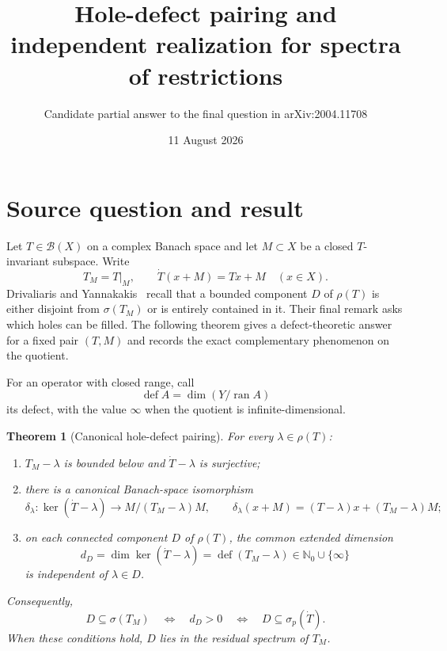\documentclass[11pt]{article}
\title{Hole-defect pairing and independent realization for spectra of restrictions}
\author{Candidate partial answer to the final question in arXiv:2004.11708}
\date{11 August 2026}
\newtheorem{theorem}{Theorem}
\newcommand{\N}{\mathbb N}
\newcommand{\B}{\mathcal B}
\newcommand{\ran}{\operatorname{ran}}
\begin{document}
\maketitle

\begin{center}
\end{center}

\section{Source question and result}

Let $T\in\B(X)$ on a complex Banach space and let $M\subset X$ be a closed
$T$-invariant subspace.  Write
\[
 T_M=T|_M,\qquad \dot T(x+M)=Tx+M\quad(x\in X).
\]
Drivaliaris and Yannakakis~\cite{source} recall that a bounded component $D$
of $\rho(T)$ is either disjoint from $\sigma(T_M)$ or is entirely contained
in it.  Their final remark asks which holes can be filled.  The following
theorem gives a defect-theoretic answer for a fixed pair $(T,M)$ and records
the exact complementary phenomenon on the quotient.

For an operator with closed range, call
\[
 \operatorname{def}A=\dim(Y/\ran A)
\]
its defect, with the value $\infty$ when the quotient is infinite-dimensional.

\begin{theorem}[Canonical hole-defect pairing]\label{thm:pairing}
For every $\lambda\in\rho(T)$:
\begin{enumerate}
\item $T_M-\lambda$ is bounded below and $\dot T-\lambda$ is surjective;
\item there is a canonical Banach-space isomorphism
\begin{equation}\label{eq:delta}
 \delta_\lambda:\ker(\dot T-\lambda)
 \longrightarrow M/(T_M-\lambda)M,
 \qquad
 \delta_\lambda(x+M)=(T-\lambda)x+(T_M-\lambda)M;
\end{equation}
\item on each connected component $D$ of $\rho(T)$, the common extended
dimension
\[
 d_D=\dim\ker(\dot T-\lambda)
     =\operatorname{def}(T_M-\lambda)\in\N_0\cup\{\infty\}
\]
is independent of $\lambda\in D$.
\end{enumerate}
Consequently,
\[
 D\subseteq\sigma(T_M)\quad\Longleftrightarrow\quad d_D>0
 \quad\Longleftrightarrow\quad D\subseteq\sigma_p(\dot T).
\]
When these conditions hold, $D$ lies in the residual spectrum of $T_M$.
\end{theorem}
\end{document}
